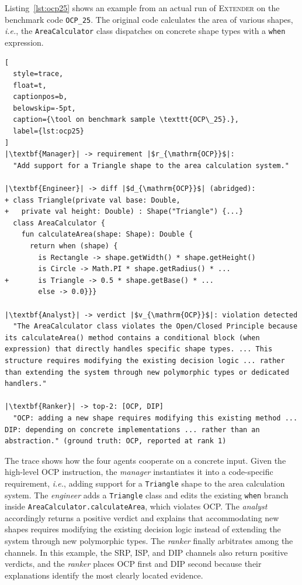 \documentclass[sigconf,screen]{acmart}
\newcommand{\tool}{\textsc{Extender}\xspace}
\newcommand{\ie}{{\em i.e.},\xspace}
\begin{document}
Listing~\ref{lst:ocp25} shows an example from an actual run of \tool on the benchmark code \texttt{OCP\_25}.
The original code calculates the area of various shapes, \ie the \texttt{AreaCalculator} class dispatches on concrete shape types with a \texttt{when} expression.
\begin{lstlisting}[
  style=trace,
  float=t,
  captionpos=b,
  belowskip=-5pt,
  caption={\tool on benchmark sample \texttt{OCP\_25}.},
  label={lst:ocp25}
]
|\textbf{Manager}| -> requirement |$r_{\mathrm{OCP}}$|:
  "Add support for a Triangle shape to the area calculation system."
   
|\textbf{Engineer}| -> diff |$d_{\mathrm{OCP}}$| (abridged):
+ class Triangle(private val base: Double,
+   private val height: Double) : Shape("Triangle") {...}
  class AreaCalculator {
    fun calculateArea(shape: Shape): Double {
      return when (shape) {
        is Rectangle -> shape.getWidth() * shape.getHeight()
        is Circle -> Math.PI * shape.getRadius() * ...
+       is Triangle -> 0.5 * shape.getBase() * ...
        else -> 0.0}}}
        
|\textbf{Analyst}| -> verdict |$v_{\mathrm{OCP}}$|: violation detected
  "The AreaCalculator class violates the Open/Closed Principle because its calculateArea() method contains a conditional block (when expression) that directly handles specific shape types. ... This structure requires modifying the existing decision logic ... rather than extending the system through new polymorphic types or dedicated handlers."
   
|\textbf{Ranker}| -> top-2: [OCP, DIP]
  "OCP: adding a new shape requires modifying this existing method ... DIP: depending on concrete implementations ... rather than an abstraction." (ground truth: OCP, reported at rank 1)

\end{lstlisting}

The trace shows how the four agents cooperate on a concrete input. 
Given the high-level OCP instruction, the \textit{manager} instantiates it into a code-specific requirement, \ie adding support for a \texttt{Triangle} shape to the area calculation system.
The \textit{engineer} adds a \texttt{Triangle} class and edits the existing \texttt{when} branch inside \texttt{AreaCalculator.calculateArea}, which violates OCP.
The \textit{analyst} accordingly returns a positive verdict and explains that accommodating new shapes requires modifying the existing decision logic instead of extending the system through new polymorphic types.
The \textit{ranker} finally arbitrates among the channels.
In this example, the SRP, ISP, and DIP channels also return positive verdicts, and the \textit{ranker} places OCP first and DIP second because their explanations identify the most clearly located evidence.
\end{document}
